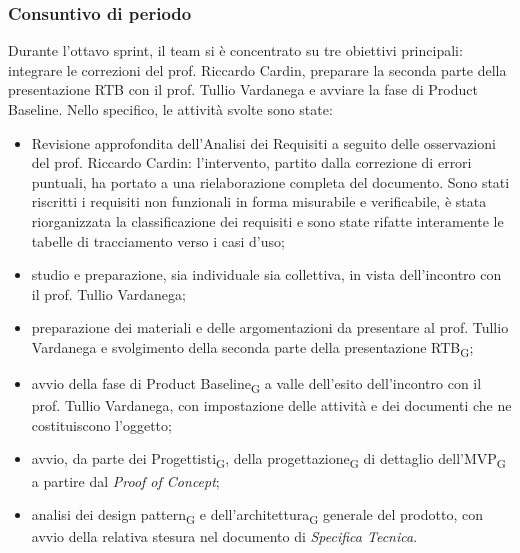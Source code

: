 ﻿\documentclass[a4paper, 10pt, colorlinks=true, linkcolor=black, urlcolor=blue, citecolor=blue, hidelinks]{article}
\begin{document}
\subsubsection{Consuntivo di periodo}
Durante l'ottavo sprint, il team si è concentrato su tre obiettivi principali: integrare le correzioni del prof. Riccardo Cardin, preparare la seconda parte della presentazione RTB con il prof. Tullio Vardanega e avviare la fase di Product Baseline. Nello specifico, le attività svolte sono state:
\begin{itemize}
    \item Revisione approfondita dell’Analisi dei Requisiti a seguito delle osservazioni del prof. Riccardo Cardin: l'intervento, partito dalla correzione di errori puntuali, ha portato a una rielaborazione completa del documento. Sono stati riscritti i requisiti non funzionali in forma misurabile e verificabile, è stata riorganizzata la classificazione dei requisiti e sono state rifatte interamente le tabelle di tracciamento verso i casi d’uso;
    \item studio e preparazione, sia individuale sia collettiva, in vista dell'incontro con il prof. Tullio Vardanega;
    \item preparazione dei materiali e delle argomentazioni da presentare al prof. Tullio Vardanega e svolgimento della seconda parte della presentazione RTB\textsubscript{G};
    \item avvio della fase di Product Baseline\textsubscript{G} a valle dell'esito dell'incontro con il prof. Tullio Vardanega, con impostazione delle attività e dei documenti che ne costituiscono l'oggetto;
    \item avvio, da parte dei Progettisti\textsubscript{G}, della progettazione\textsubscript{G} di dettaglio dell'MVP\textsubscript{G} a partire dal \textit{Proof of Concept};
    \item analisi dei design pattern\textsubscript{G} e dell'architettura\textsubscript{G} generale del prodotto, con avvio della relativa stesura nel documento di \textit{Specifica Tecnica}.
\end{itemize} 
\end{document}
